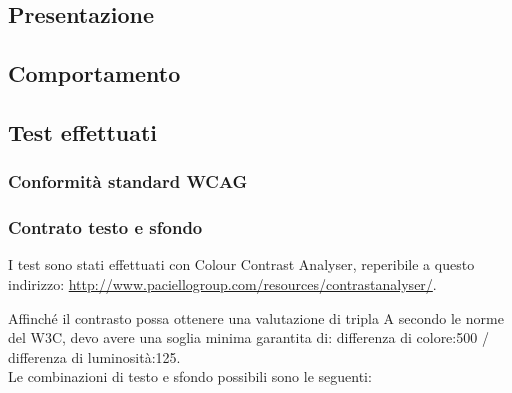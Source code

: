 \documentclass[12pt]{article}
\begin{document}
	\subsection{Presentazione}

	\subsection{Comportamento}

	\newpage
	
	\subsection{Test effettuati}
		\subsubsection{Conformità standard WCAG}
		\subsubsection{Contrato testo e sfondo}
		
		I test sono stati effettuati con Colour Contrast Analyser, reperibile a questo indirizzo: \url{http://www.paciellogroup.com/resources/contrastanalyser/}.\medskip
		
Affinché il contrasto possa ottenere una valutazione di tripla A secondo le norme del W3C, devo avere una soglia minima garantita di: differenza di colore:500 / differenza di luminosità:125.\\
Le combinazioni di testo e sfondo possibili sono le seguenti:
\end{document}
